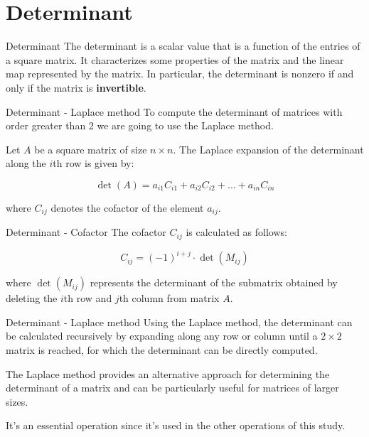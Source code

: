 \documentclass{beamer}
\begin{document}
\section{Determinant}
\begin{frame}{Determinant}
    The \alert{determinant} is a scalar value that is a function of the entries of a square matrix. It characterizes some properties of the matrix and the linear map represented by the matrix. In particular, the determinant is nonzero if and only if the matrix is \textbf{invertible}.

\end{frame}

\begin{frame}{Determinant - Laplace method}
    To compute the determinant of matrices with order greater than 2 we are going to use the \alert{Laplace method}.


    Let $A$ be a square matrix of size $n \times n$. The Laplace expansion of the determinant along the $i$th row is given by:

    $$
        \det(A) = a_{i1} C_{i1} + a_{i2} C_{i2} + \ldots + a_{in} C_{in}
    $$

    where $C_{ij}$ denotes the cofactor of the element $a_{ij}$.
\end{frame}

\begin{frame}{Determinant - Cofactor}
    The \alert{cofactor} $C_{ij}$ is calculated as follows:

    $$
        C_{ij} = (-1)^{i+j} \cdot \det(M_{ij})
    $$

    where $\det(M_{ij})$ represents the determinant of the submatrix obtained by deleting the $i$th row and $j$th column from matrix $A$.
\end{frame}

\begin{frame}{Determinant - Laplace method}
    Using the Laplace method, the determinant can be calculated recursively by expanding along any row or column until a $2 \times 2$ matrix is reached, for which the determinant can be directly computed.

    The Laplace method provides an alternative approach for determining the determinant of a matrix and can be particularly useful for matrices of larger sizes.

    It's an essential operation since it's used in the other operations of this study.
\end{frame}
\end{document}
